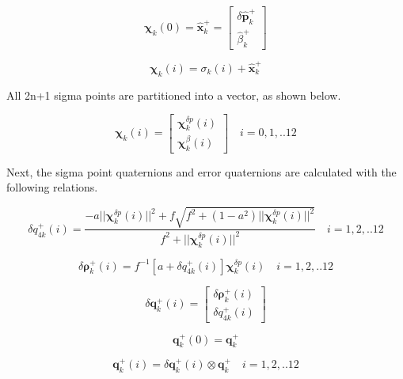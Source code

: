 \documentclass[12pt]{report}
\begin{document}
 \begin{equation}
	\pmb{\chi}_k(0) = \pmb{\hat{x}}_k^+ = \begin{bmatrix} \delta\hat{\pmb{p}}_k^+ \\ \hat{\beta}_k^+
		\end{bmatrix}
\end{equation} 


 \begin{equation}
	\pmb{\chi}_k(i) = \sigma_k(i) +  \pmb{\hat{x}}_k^+
\end{equation} 

\noindent All 2n+1 sigma points are partitioned into a vector, as shown below.

\begin{equation}
	\pmb{\chi}_k(i) = \begin{bmatrix} \pmb{\chi}_k^{\delta p}(i) \\ \pmb{\chi}_k^{\beta}(i)
	\end{bmatrix} \quad 	i = 0,1,..12
\end{equation} 

\noindent Next, the sigma point quaternions and error quaternions are calculated with the following relations.

 \begin{equation}
	\delta q_{4k}^+(i) = \frac{-a||\pmb{\chi}_k^{\delta p}(i)||^2 + f \sqrt{f^2 + (1 - a^2)||\pmb{\chi}_k^{\delta p}(i)||^2}}{f^2 + ||\pmb{\chi}_k^{\delta p}(i)||^2} \quad i = 1,2,..12
\end{equation} 

 \begin{equation}
	\delta \pmb{\rho}_k^+(i) = f^{-1} [a + \delta q_{4k}^+(i)]\pmb{\chi}_k^{\delta p}(i) \quad i = 1,2,..12
\end{equation} 

\begin{equation}
\delta\pmb{q}_k^+(i)  = \begin{bmatrix} 	\delta \pmb{\rho}_k^+(i) \\ 	\delta q_{4k}^+(i)
\end{bmatrix}
\end{equation} 

\begin{equation}
\pmb{q}_k^+(0)  = \pmb{q}_k^+
\end{equation} 

\begin{equation}
	\pmb{q}_k^+(i)  = \delta\pmb{q}_k^+(i) \otimes \pmb{q}_k^+ \quad i = 1,2,..12
\end{equation} 
\end{document}
